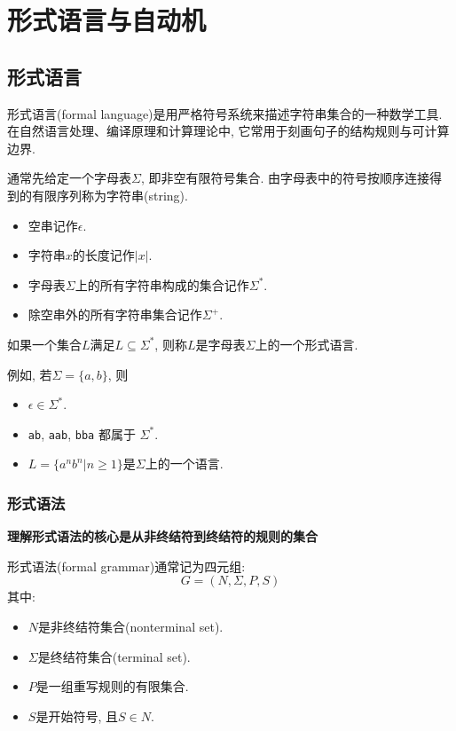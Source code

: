
\chapter{形式语言与自动机}


\section{形式语言}


形式语言(formal language)是用严格符号系统来描述字符串集合的一种数学工具.
在自然语言处理、编译原理和计算理论中, 它常用于刻画句子的结构规则与可计算边界.

通常先给定一个字母表$\Sigma$, 即非空有限符号集合.
由字母表中的符号按顺序连接得到的有限序列称为字符串(string).

\begin{itemize}
\item 空串记作$\epsilon$.
\item 字符串$x$的长度记作$|x|$.
\item 字母表$\Sigma$上的所有字符串构成的集合记作$\Sigma^*$.
\item 除空串外的所有字符串集合记作$\Sigma^+$.
\end{itemize}

如果一个集合$L$满足$L \subseteq \Sigma^*$, 则称$L$是字母表$\Sigma$上的一个形式语言.

例如, 若$\Sigma = \{a,b\}$, 则

\begin{itemize}
\item $\epsilon \in \Sigma^*$.
\item \texttt{ab}, \texttt{aab}, \texttt{bba} 都属于 $\Sigma^*$.
\item $L = \{a^n b^n | n \ge 1\}$是$\Sigma$上的一个语言.
\end{itemize}

\subsection{形式语法}


\textbf{理解形式语法的核心是从非终结符到终结符的规则的集合}

形式语法(formal grammar)通常记为四元组:
\[
G = (N, \Sigma, P, S)
\]
其中:

\begin{itemize}
\item $N$是非终结符集合(nonterminal set).
\item $\Sigma$是终结符集合(terminal set).
\item $P$是一组重写规则的有限集合.
\item $S$是开始符号, 且$S \in N$.
\end{itemize}

